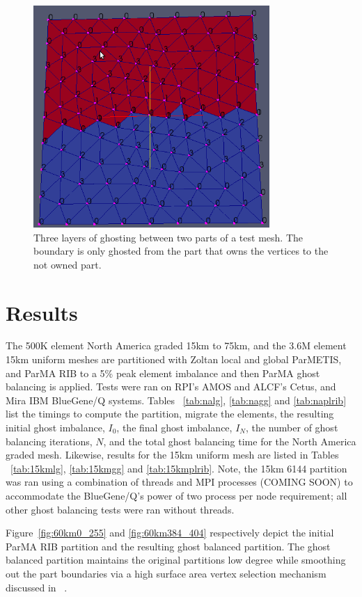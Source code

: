 \documentclass[a4paper]{article}
\begin{document}
\begin{figure} 
\centering
\includegraphics[width=0.8\textwidth]{plateghosts.png}
\caption{\label{fig:ownership4} Three layers of ghosting between two parts of a test mesh.  The boundary is only ghosted from the part that owns the vertices to the not owned part.}
\end{figure}

\section{Results}

The 500K element North America graded 15km to 75km, and the 3.6M element 15km uniform meshes are partitioned with Zoltan local and global ParMETIS, and ParMA RIB to a 5\% peak element imbalance and then ParMA ghost balancing is applied. 
Tests were ran on RPI's AMOS and ALCF's Cetus, and Mira IBM BlueGene/Q systems.  
Tables ~\ref{tab:nalg}, \ref{tab:nagg} and \ref{tab:naplrib} list the timings to compute the partition, migrate the elements, the resulting initial ghost imbalance, $I_0$, the final ghost imbalance, $I_N$, the number of ghost balancing iterations, $N$, and the total ghost balancing time for the North America graded mesh.
Likewise, results for the 15km uniform mesh are listed in Tables ~\ref{tab:15kmlg}, \ref{tab:15kmgg} and \ref{tab:15kmplrib}.  
Note, the 15km 6144 partition was ran using a combination of threads and MPI processes (COMING SOON) to accommodate the BlueGene/Q's power of two process per node requirement; all other ghost balancing tests were ran without threads.

Figure~\ref{fig:60km0_255} and \ref{fig:60km384_404} respectively depict the initial ParMA RIB partition and the resulting ghost balanced partition.  
The ghost balanced partition maintains the original partitions low degree while smoothing out the part boundaries via a high surface area vertex selection mechanism discussed in ~\cite{ParMA-2014}.
\end{document}
